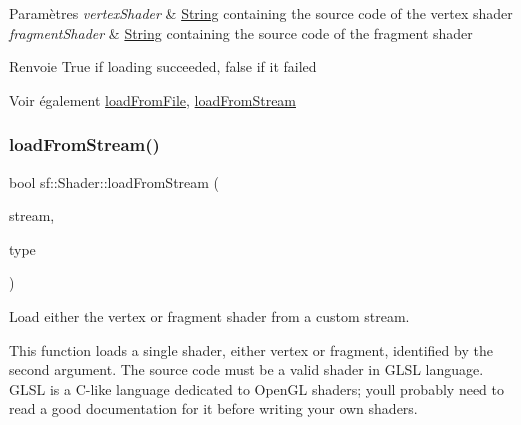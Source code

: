 \begin{DoxyParams}{Paramètres}
{\em vertex\+Shader} & \hyperlink{classsf_1_1String}{String} containing the source code of the vertex shader \\
\hline
{\em fragment\+Shader} & \hyperlink{classsf_1_1String}{String} containing the source code of the fragment shader\\
\hline
\end{DoxyParams}
\begin{DoxyReturn}{Renvoie}
True if loading succeeded, false if it failed
\end{DoxyReturn}
\begin{DoxySeeAlso}{Voir également}
\hyperlink{classsf_1_1Shader_a053a5632848ebaca2fcd8ba29abe9e6e}{load\+From\+File}, \hyperlink{classsf_1_1Shader_a2ee1b130c0606e4f8bcdf65c1efc2a53}{load\+From\+Stream} 
\end{DoxySeeAlso}
\mbox{\label{classsf_1_1Shader_a2ee1b130c0606e4f8bcdf65c1efc2a53}} 
\subsubsection{\texorpdfstring{load\+From\+Stream()}{loadFromStream()}\hspace{0.1cm}{\footnotesize\ttfamily [1/2]}}
{\footnotesize\ttfamily bool sf\+::\+Shader\+::load\+From\+Stream (\begin{DoxyParamCaption}\item[{\hyperlink{classsf_1_1InputStream}{Input\+Stream} \&}]{stream,  }\item[{\hyperlink{classsf_1_1Shader_afaa1aa65e5de37b74d047da9def9f9b3}{Type}}]{type }\end{DoxyParamCaption})}



Load either the vertex or fragment shader from a custom stream. 

This function loads a single shader, either vertex or fragment, identified by the second argument. The source code must be a valid shader in G\+L\+SL language. G\+L\+SL is a C-\/like language dedicated to Open\+GL shaders; you\textquotesingle{}ll probably need to read a good documentation for it before writing your own shaders.


